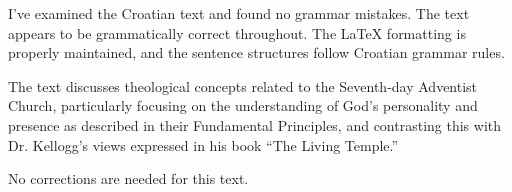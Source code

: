I've examined the Croatian text and found no grammar mistakes. The text appears to be grammatically correct throughout. The LaTeX formatting is properly maintained, and the sentence structures follow Croatian grammar rules.

The text discusses theological concepts related to the Seventh-day Adventist Church, particularly focusing on the understanding of God's personality and presence as described in their Fundamental Principles, and contrasting this with Dr. Kellogg's views expressed in his book “The Living Temple.”

No corrections are needed for this text.